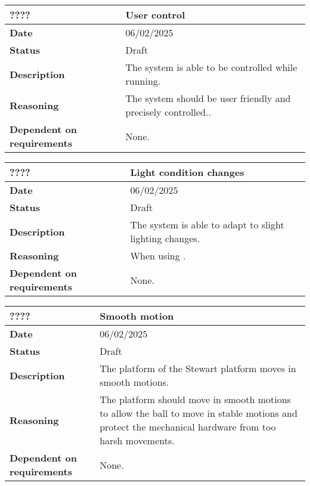 \documentclass{article}
\begin{document}
\begin{table}[H]
    \renewcommand{\arraystretch}{1.3}
    \begin{tabular}{|l|p{10cm}|}
        \hline
        \rowcolor{gray!50}
        \textbf{????} & \textbf{User control} \\ \hline
        \textbf{Date} & 06/02/2025 \\ \hline
        \textbf{Status} & Draft \\ \hline
        \textbf{Description} & The system is able to be controlled while running. \\ \hline
        \textbf{Reasoning} & The system should be user friendly and precisely controlled.. \\ \hline
        \textbf{Dependent on requirements} & None. \\ \hline
    \end{tabular}
\end{table}

\begin{table}[H]
    \renewcommand{\arraystretch}{1.3}
    \begin{tabular}{|l|p{10cm}|}
        \hline
        \rowcolor{gray!50}
        \textbf{????} & \textbf{Light condition changes} \\ \hline
        \textbf{Date} & 06/02/2025 \\ \hline
        \textbf{Status} & Draft \\ \hline
        \textbf{Description} & The system is able to adapt to slight lighting changes. \\ \hline
        \textbf{Reasoning} & When using . \\ \hline
        \textbf{Dependent on requirements} & None. \\ \hline
    \end{tabular}
\end{table}

\begin{table}[H]
    \renewcommand{\arraystretch}{1.3}
    \begin{tabular}{|l|p{10cm}|}
        \hline
        \rowcolor{gray!50}
        \textbf{????} & \textbf{Smooth motion} \\ \hline
        \textbf{Date} & 06/02/2025 \\ \hline
        \textbf{Status} & Draft \\ \hline
        \textbf{Description} & The platform of the Stewart platform moves in smooth motions. \\ \hline
        \textbf{Reasoning} & The platform should move in smooth motions to allow the ball to move in stable motions and protect the mechanical hardware from too harsh movements. \\ \hline
        \textbf{Dependent on requirements} & None. \\ \hline
    \end{tabular}
\end{table}
\end{document}
